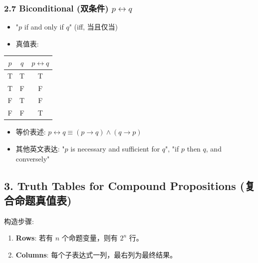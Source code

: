 \documentclass[10pt,a4paper,openany]{ctexbook}
\theoremstyle{definition}
\theoremstyle{remark}
\begin{document}
\subsubsection{2.7 Biconditional (双条件) $p \leftrightarrow q$}

\begin{itemize}
\item "$p$ if and only if $q$" (iff, 当且仅当)
\item 真值表:

\end{itemize}

\begin{center}
\begin{tabular}{ccc}
\hline
$p$ & $q$ & $p \leftrightarrow q$ \\ \hline
T & T & T \\
T & F & F \\
F & T & F \\
F & F & T \\
\hline
\end{tabular}

\end{center}

\begin{itemize}
\item 等价表述: $p \leftrightarrow q \equiv (p \to q) \land (q \to p)$
\item 其他英文表达: "$p$ is necessary and sufficient for $q$", "if $p$ then $q$, and conversely"

\end{itemize}

\vspace{-2pt}

\subsection{3. Truth Tables for Compound Propositions (复合命题真值表)}

构造步骤:
\begin{enumerate}
\item \textbf{Rows}: 若有 $n$ 个命题变量，则有 $2^n$ 行。
\item \textbf{Columns}: 每个子表达式一列，最右列为最终结果。

\end{enumerate}
\end{document}
